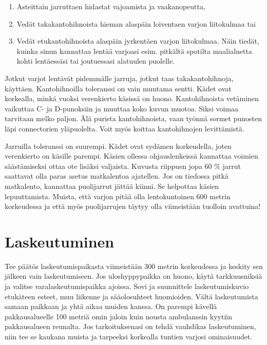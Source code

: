 \begin{enumerate}[label=\bfseries \arabic*)]
\item  Asteittain jarruttaen hidastat vajoamista ja vaakanopeutta,  
\item  Vedät takakantohihnoista hieman alaspäin loiventaen varjon liitokulmaa tai  
\item  Vedät etukantohihnoista alaspäin jyrkentäen varjon liitokulmaa. Näin tiedät, kuinka sinun kannattaa lentää varjoasi esim. pitkältä spotilta maalialuetta kohti lentäessäsi tai joutuessasi alatuulen puolelle. 
\end{enumerate}

Jotkut varjot lentävät pidemmälle jarruja, jotkut taas takakantohihnoja, käyttäen. Kantohihnoilla toleranssi on vain muutama sentti. Kädet ovat korkealla, minkä vuoksi verenkierto käsissä on huono. Kantohihnoista vetäminen vaikuttaa C- ja D-punoksiin ja muuttaa koko kuvun muotoa. Siksi voimaa tarvitaan melko paljon. Älä purista kantohihnoista, vaan työnnä sormet punosten läpi connectorien yläpuolelta. Voit myös koittaa kantohihnojen levittämistä. 


Jarruilla toleranssi on suurempi. Kädet ovat sydämen korkeudella, joten verenkierto on käsille parempi. Käsien ollessa ohjauslenkeissä kannattaa voimien säästämiseksi ottaa ote lisäksi valjaista. Kuvusta riippuen jopa 60 \% jarrut saattavat olla paras asetus matkalentoa ajatellen. Jos on tiedossa pitkä matkalento, kannattaa puolijarrut jättää kiinni. Se helpottaa käsien lepuuttamista. Muista, että varjon pitää olla lentokuntoinen 600 metrin korkeudessa ja että myös puolijarrujen täytyy olla viimeistään tuolloin avattuina! 

\section{ Laskeutuminen }
\label{hyppytapahtuma-kuvunkasittelyhypyilla-laskeutuminen}


Tee päätös laskeutumispaikasta viimeistään 300 metrin korkeudessa ja keskity sen jälkeen vain laskeutumiseen. Jos uloshyppypaikka on huono, käytä tarkkuusniksiä ja valitse varalaskeutumispaikka ajoissa. Sovi ja suunnittele laskeutumiskuvio etukäteen esteet, muu liikenne ja sääolosuhteet huomioiden. Vältä laskeutumista samaan paikkaan ja yhtä aikaa muiden kanssa. On parempi kävellä pakkausalueelle 100 metriä omin jaloin kuin nousta ambulanssin kyytiin pakkausalueen reunalta. Jos tarkoituksenasi on tehdä vauhdikas laskeutuminen, niin tee se kaukana muista ja tarpeeksi korkealla tuntien varjosi ominaisuudet. 


